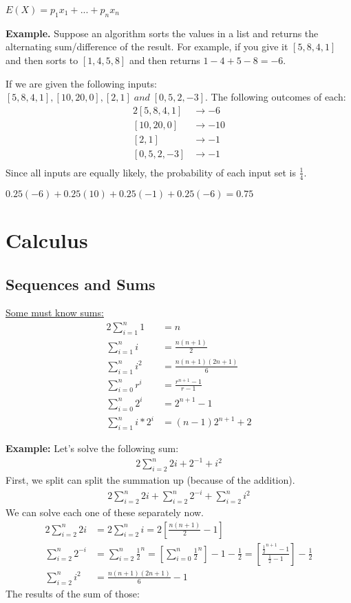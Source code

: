 \documentclass{article}
\begin{document}
\begin{center}
  $E(X) = p_1x_1 + ... + p_nx_n $
\end{center}

\textbf{Example.} Suppose an algorithm sorts the values in a list and returns the alternating sum/difference 
of the result. For example, if you give it $[5,8,4,1]$ and then sorts to $[1,4,5,8]$ and then returns $1-4+5-8=-6$.

If we are given the following inputs: $[5, 8, 4, 1], [10, 20, 0], [2, 1]\;and\;[0, 5, 2, -3]$.
The following outcomes of each: 
\begin{alignat*}{2}
  [5,8,4,1] &\rightarrow -6\\
  [10,20,0] &\rightarrow -10\\
  [2,1] &\rightarrow -1\\
  [0,5,2,-3] &\rightarrow -1\\
\end{alignat*}
Since all inputs are equally likely, the probability of each input set is $\frac{1}{4}$.
\begin{center}
$0.25(-6) + 0.25(10) + 0.25(-1) + 0.25(-6) = 0.75$
\end{center}
\section{Calculus}
\subsection{Sequences and Sums}
\underline{Some must know sums:}
\begin{alignat*}{2}
  \sum_{i=1}^n 1 &= n \\
  \sum_{i=1}^n i &= \frac{n(n+1)}{2}\\
  \sum_{i=1}^n i^2 &= \frac{n(n+1)(2n+1)}{6}\\
  \sum_{i=0}^n r^i &= \frac{r^{n+1} - 1}{r-1} \\ 
  \sum_{i=0}^n 2^i &= 2^{n+1} - 1\\
  \sum_{i=1}^n i*2^i &= (n-1)2^{n+1} + 2
\end{alignat*}

\textbf{Example:} Let's solve the following sum:
\begin{alignat*}{2}
  \sum_{i=2}^n 2i + 2^{-1}+i^2
\end{alignat*}
First, we split can split the summation up (because of the addition).
\begin{alignat*}{2}
  \sum_{i=2}^n 2i + \sum_{i=2}^n2^{-i} + \sum_{i=2}^ni^2
\end{alignat*}
We can solve each one of these separately now.
\begin{alignat*}{2}
  \sum_{i=2}^n 2i &= 2\sum_{i=2}^n i = 2 \left[\frac{n(n+1)}{2} - 1\right] \\
  \sum_{i=2}^n 2^{-i} &= \sum_{i=2}^n \frac{1}{2}^n = \left[\sum_{i=0}^n \frac{1}{2}^n \right] - 1 
  - \frac{1}{2} = \left[\frac{\frac{1}{2}^{n+1} - 1}{\frac{1}{2}-1}\right] - \frac{1}{2} \\
  \sum_{i=2}^n i^2 &= \frac{n(n+1)(2n+1)}{6} - 1
\end{alignat*}
The results of the sum of those:
\end{document}
